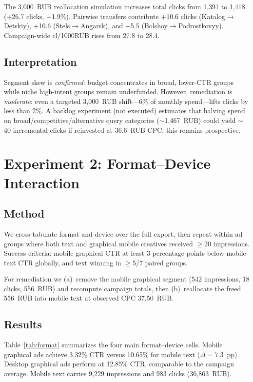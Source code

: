 \documentclass{article}
\begin{document}
The 3{,}000~RUB reallocation simulation increases total clicks from 1{,}391 to 1{,}418 (+26.7 clicks, +1.9\%). Pairwise transfers contribute +10.6 clicks (Katalog$\rightarrow$Detskiy), +10.6 (Stels$\rightarrow$Angarsk), and +5.5 (Bolshoy$\rightarrow$Podrostkovyy). Campaign-wide cl/1000RUB rises from 27.8 to 28.4.

\subsection{Interpretation}

Segment skew is \emph{confirmed}: budget concentrates in broad, lower-CTR groups while niche high-intent groups remain underfunded. However, remediation is \emph{moderate}: even a targeted 3{,}000~RUB shift---6\% of monthly spend---lifts clicks by less than 2\%. A backlog experiment (not executed) estimates that halving spend on broad/competitive/alternative query categories ($\sim$1{,}467~RUB) could yield $\sim$40 incremental clicks if reinvested at 36.6~RUB CPC; this remains prospective.

\section{Experiment 2: Format--Device Interaction}

\subsection{Method}

We cross-tabulate format and device over the full export, then repeat within ad groups where both text and graphical mobile creatives received $\geq$20 impressions. Success criteria: mobile graphical CTR at least 3 percentage points below mobile text CTR globally, and text winning in $\geq$5/7 paired groups.

For remediation we (a)~remove the mobile graphical segment (542 impressions, 18 clicks, 556~RUB) and recompute campaign totals, then (b)~reallocate the freed 556~RUB into mobile text at observed CPC 37.50~RUB.

\subsection{Results}

Table~\ref{tab:format} summarizes the four main format--device cells. Mobile graphical ads achieve 3.32\% CTR versus 10.65\% for mobile text ($\Delta = 7.3$~pp). Desktop graphical ads perform at 12.85\% CTR, comparable to the campaign average. Mobile text carries 9{,}229 impressions and 983 clicks (36{,}863~RUB).
\end{document}
